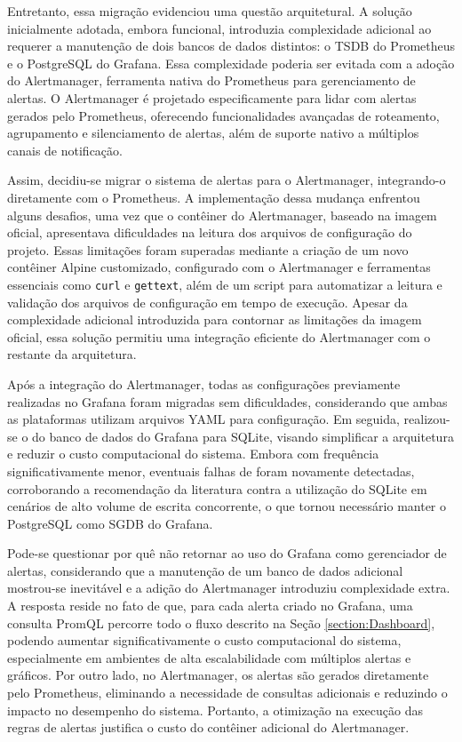 {Entretanto, essa migração evidenciou uma questão arquitetural. A solução inicialmente adotada, embora funcional, introduzia complexidade adicional ao requerer a manutenção de dois bancos de dados distintos: o TSDB do Prometheus e o PostgreSQL do Grafana. Essa complexidade poderia ser evitada com a adoção do Alertmanager, ferramenta nativa do Prometheus para gerenciamento de alertas. O Alertmanager é projetado especificamente para lidar com alertas gerados pelo Prometheus, oferecendo funcionalidades avançadas de roteamento, agrupamento e silenciamento de alertas, além de suporte nativo a múltiplos canais de notificação.

Assim, decidiu-se migrar o sistema de alertas para o Alertmanager, integrando-o diretamente com o Prometheus. A implementação dessa mudança enfrentou alguns desafios, uma vez que o contêiner do Alertmanager, baseado na imagem oficial, apresentava dificuldades na leitura dos arquivos de configuração do projeto. Essas limitações foram superadas mediante a criação de um novo contêiner Alpine customizado, configurado com o Alertmanager e ferramentas essenciais como \verb|curl| e \verb|gettext|, além de um script para automatizar a leitura e validação dos arquivos de configuração em tempo de execução. Apesar da complexidade adicional introduzida para contornar as limitações da imagem oficial, essa solução permitiu uma integração eficiente do Alertmanager com o restante da arquitetura.

Após a integração do Alertmanager, todas as configurações previamente realizadas no Grafana foram migradas sem dificuldades, considerando que ambas as plataformas utilizam arquivos YAML para configuração. Em seguida, realizou-se o  do banco de dados do Grafana para SQLite, visando simplificar a arquitetura e reduzir o custo computacional do sistema. Embora com frequência significativamente menor, eventuais falhas de  foram novamente detectadas, corroborando a recomendação da literatura contra a utilização do SQLite em cenários de alto volume de escrita concorrente, o que tornou necessário manter o PostgreSQL como SGDB do Grafana.

Pode-se questionar por quê não retornar ao uso do Grafana como gerenciador de alertas, considerando que a manutenção de um banco de dados adicional mostrou-se inevitável e a adição do Alertmanager introduziu complexidade extra. A resposta reside no fato de que, para cada alerta criado no Grafana, uma consulta PromQL percorre todo o fluxo descrito na Seção \ref{section:Dashboard}, podendo aumentar significativamente o custo computacional do sistema, especialmente em ambientes de alta escalabilidade com múltiplos alertas e gráficos. Por outro lado, no Alertmanager, os alertas são gerados diretamente pelo Prometheus, eliminando a necessidade de consultas adicionais e reduzindo o impacto no desempenho do sistema. Portanto, a otimização na execução das regras de alertas justifica o custo do contêiner adicional do Alertmanager.

}
